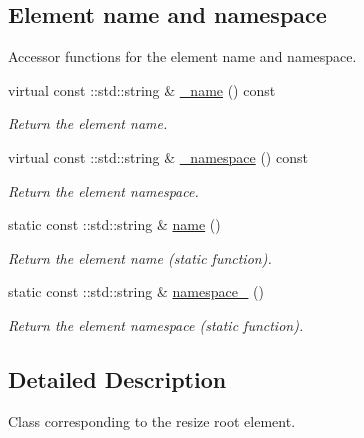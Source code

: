 \subsection*{Element name and namespace}
\label{_amgrpd4b5b61f6e07390f4af2465e04571f34}
Accessor functions for the element name and namespace. \begin{DoxyCompactItemize}
\item 
virtual const ::std::string \& \hyperlink{classopenstack_1_1xml_1_1Resize___acd2f618e53fa0b1c33acdf3f566d2f92}{\_\-name} () const 
\begin{DoxyCompactList}\small\item\em Return the element name. \item\end{DoxyCompactList}\item 
virtual const ::std::string \& \hyperlink{classopenstack_1_1xml_1_1Resize___a67ecd3ec72ead4736e9ce0d504c7d980}{\_\-namespace} () const 
\begin{DoxyCompactList}\small\item\em Return the element namespace. \item\end{DoxyCompactList}\item 
static const ::std::string \& \hyperlink{classopenstack_1_1xml_1_1Resize___a6fa49ff39b8abab250c879015f0964d0}{name} ()
\begin{DoxyCompactList}\small\item\em Return the element name (static function). \item\end{DoxyCompactList}\item 
static const ::std::string \& \hyperlink{classopenstack_1_1xml_1_1Resize___a925113d94a47f59e386b4c3ed51c87fd}{namespace\_\-} ()
\begin{DoxyCompactList}\small\item\em Return the element namespace (static function). \item\end{DoxyCompactList}\end{DoxyCompactItemize}


\subsection{Detailed Description}
Class corresponding to the resize root element. 

